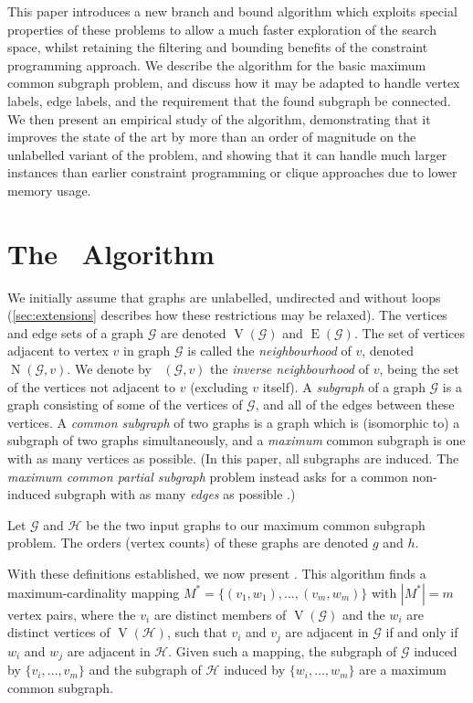 \documentclass[letterpaper]{article}
\newcommand{\citep}[1]{\cite{#1}}
\newcommand{\McSplit}{\textproc{McSplit}}
\newcommand{\graphG}{\mathcal{G}}
\newcommand{\graphH}{\mathcal{H}}
\DeclareMathOperator{\V}{V}
\DeclareMathOperator{\E}{E}
\DeclareMathOperator{\N}{N}
\DeclareMathOperator{\invN}{\overline{N}}
\begin{document}
This paper introduces a new branch and bound algorithm which exploits special
properties of these problems to allow a much faster exploration of the search
space, whilst retaining the filtering and bounding benefits of the constraint
programming approach. We describe the algorithm for the basic maximum common
subgraph problem, and discuss how it may be adapted to handle vertex labels,
edge labels, and the requirement that the found subgraph be connected. We then
present an empirical study of the algorithm, demonstrating that it improves the
state of the art by more than an order of magnitude on the unlabelled variant
of the problem, and showing that it can handle much larger instances than
earlier constraint programming or clique approaches due to lower memory usage.

\section{The \McSplit\ Algorithm}

We initially assume that graphs are unlabelled, undirected and without loops
(\cref{sec:extensions} describes how these restrictions may be relaxed).
The vertices and edge sets of a graph $\graphG$ are denoted $\V(\graphG)$ and $\E(\graphG)$.  The
set of vertices adjacent to vertex $v$ in graph $\graphG$ is called the
\emph{neighbourhood} of $v$, denoted $\N(\graphG, v)$. We denote by $\invN(\graphG, v)$ the
\emph{inverse neighbourhood} of $v$, being the set of the vertices not adjacent
to $v$ (excluding $v$ itself). A \emph{subgraph} of a graph $\graphG$ is a graph
consisting of some of the vertices of $\graphG$, and all of the edges between these
vertices. A \emph{common subgraph} of two graphs is a graph which is
(isomorphic to) a subgraph of two graphs simultaneously, and a \emph{maximum}
common subgraph is one with as many vertices as possible. (In this paper, all
subgraphs are induced. The \emph{maximum common partial subgraph} problem
instead asks for a common non-induced subgraph with as many \emph{edges} as
possible \citep{DBLP:conf/cp/NdiayeS11}.)

Let $\graphG$ and $\graphH$ be the two input graphs to our maximum common subgraph problem.
The orders (vertex counts) of these graphs are denoted $g$ and $h$.

With these definitions established, we now present \McSplit. This algorithm
finds a maximum-cardinality mapping $M^* = \{(v_1, w_1), \dots, (v_{m},
w_{m})\}$ with $|M^*| = m$ vertex pairs, where the $v_i$ are distinct members
of $\V(\graphG)$ and the $w_i$ are distinct vertices of $\V(\graphH)$, such
that $v_i$ and $v_j$ are adjacent in $\graphG$ if and only if $w_i$ and $w_j$
are adjacent in $\graphH$.  Given such a mapping, the subgraph of $\graphG$
induced by $\{v_i, \dots, v_{m}\}$ and the subgraph of $\graphH$ induced by
$\{w_i, \dots, w_{m}\}$ are a maximum common subgraph.
\end{document}
